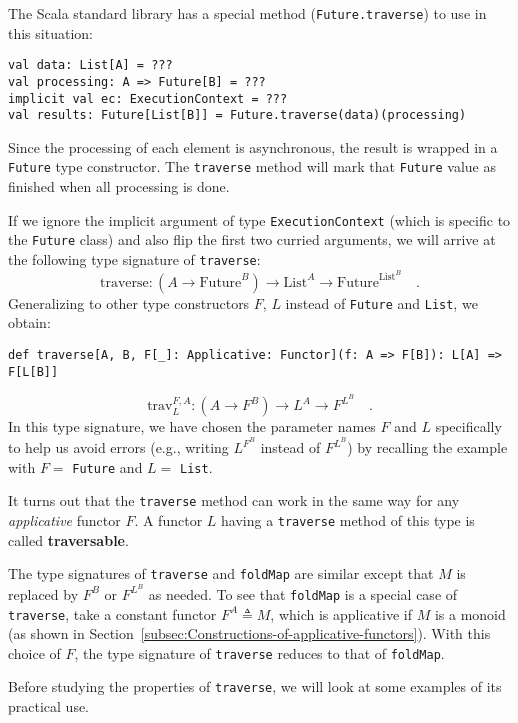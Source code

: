 The Scala standard library has a special method (\lstinline!Future.traverse!)
to use in this situation:
\begin{lstlisting}
val data: List[A] = ???
val processing: A => Future[B] = ???
implicit val ec: ExecutionContext = ???
val results: Future[List[B]] = Future.traverse(data)(processing)
\end{lstlisting}
Since the processing of each element is asynchronous, the result is
wrapped in a \lstinline!Future! type constructor. The \lstinline!traverse!
method will mark that \lstinline!Future! value as finished when all
processing is done.

If we ignore the implicit argument of type \lstinline!ExecutionContext!
(which is specific to the \lstinline!Future! class) and also flip
the first two curried arguments, we will arrive at the following type
signature of \lstinline!traverse!:
\[
\text{traverse}:(A\rightarrow\text{Future}^{B})\rightarrow\text{List}^{A}\rightarrow\text{Future}^{\text{List}^{B}}\quad.
\]
Generalizing to other type constructors $F$, $L$ instead of \lstinline!Future!
and \lstinline!List!, we obtain:
\begin{lstlisting}
def traverse[A, B, F[_]: Applicative: Functor](f: A => F[B]): L[A] => F[L[B]]
\end{lstlisting}
\[
\text{trav}_{L}^{F,A}:(A\rightarrow F^{B})\rightarrow L^{A}\rightarrow F^{L^{B}}\quad.
\]
In this type signature, we have chosen the parameter names $F$ and
$L$ specifically to help us avoid errors (e.g., writing $L^{F^{B}}$
instead of $F^{L^{B}}$) by recalling the example with $F=$ \lstinline!Future!
and $L=$ \lstinline!List!.

It turns out that the \lstinline!traverse! method can work in the
same way for any \emph{applicative} functor $F$. A functor $L$ having
a \lstinline!traverse! method of this type is called \textbf{traversable}.

The type signatures of \lstinline!traverse! and \lstinline!foldMap!
are similar except that $M$ is replaced by $F^{B}$ or $F^{L^{B}}$
as needed. To see that \lstinline!foldMap! is a special case of \lstinline!traverse!,
take a constant functor $F^{A}\triangleq M$, which is applicative
if $M$ is a monoid (as shown in Section~\ref{subsec:Constructions-of-applicative-functors}).
With this choice of $F$, the type signature of \lstinline!traverse!
reduces to that of \lstinline!foldMap!.

Before studying the properties of \lstinline!traverse!, we will look
at some examples of its practical use.


